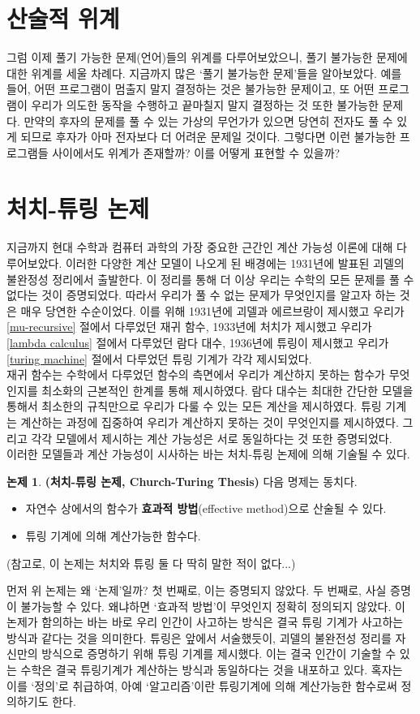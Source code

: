 \documentclass[b5paper]{book}
\theoremstyle{definition}
\newtheorem{thesis}{논제}[chapter]
\begin{document}
\section{산술적 위계}
그럼 이제 풀기 가능한 문제(언어)들의 위계를 다루어보았으니, 풀기 불가능한 문제에 대한 위계를 
세울 차례다.
지금까지 많은 `풀기 불가능한 문제'들을 알아보았다. 예를 들어, 어떤 프로그램이 멈출지 말지 결정하는 것은
불가능한 문제이고, 또 어떤 프로그램이 우리가 의도한 동작을 수행하고 끝마칠지 말지 결정하는 것 또한
불가능한 문제다. 만약의 후자의 문제를 풀 수 있는 가상의 무언가가 있으면 당연히 전자도 풀 수 있게 되므로
후자가 아마 전자보다 더 어려운 문제일 것이다. 그렇다면 이런 불가능한 프로그램들 사이에서도 
위계가 존재할까? 이를 어떻게 표현할 수 있을까?
\section{처치-튜링 논제}
지금까지 현대 수학과 컴퓨터 과학의 가장 중요한 근간인 계산 가능성 이론에
대해 다루어보았다. 이러한 다양한 계산 모델이 나오게 된 배경에는 1931년에
발표된 괴델의 불완정성 정리에서 출발한다. 이 정리를 통해 더 이상 우리는 수학의 모든 문제를 풀 수 
없다는 것이 증명되었다. 따라서 우리가 풀 수 없는 문제가 무엇인지를 알고자 하는 것은 매우 당연한
수순이었다. 이를 위해 1931년에 괴델과 에르브랑이 제시했고 우리가 \ref{mu-recursive} 절에서 다루었던 재귀 함수, 
1933년에 처치가 제시했고 우리가 \ref{lambda calculus} 절에서 다루었던 람다 대수, 1936년에 튜링이 제시했고
우리가 \ref{turing machine} 절에서 다루었던 튜링 기계가 각각 제시되었다. \\
재귀 함수는 수학에서 다루었던 함수의 측면에서 우리가 계산하지 못하는 함수가 무엇인지를 최소화의 근본적인
한계를 통해 제시하였다. 람다 대수는 최대한 간단한 모델을 통해서 최소한의 규칙만으로 우리가 다룰 수 있는 
모든 계산을 제시하였다. 튜링 기계는 계산하는 과정에 집중하여 우리가 계산하지 못하는 것이 무엇인지를
제시하였다. 그리고 각각 모델에서 제시하는 계산 가능성은 서로 동일하다는 것 또한 증명되었다. \\
이러한 모델들과 계산 가능성이 시사하는 바는 처치-튜링 논제에 의해 기술될 수 있다.
\begin{thesis} 
    \textbf{(처치-튜링 논제, Church-Turing Thesis)} 다음 명제는 동치다.
    \begin{itemize}
        \item 자연수 상에서의 함수가 \textbf{효과적 방법}(effective method)으로 산술될 수 있다.
        \item 튜링 기계에 의해 계산가능한 함수다.
    \end{itemize}
    (참고로, 이 논제는 처치와 튜링 둘 다 딱히 말한 적이 없다...)
\end{thesis}
먼저 위 논제는 왜 `논제'일까? 첫 번째로, 이는 증명되지 않았다. 두 번째로, 사실 증명이 불가능할 수 있다.
왜냐하면 `효과적 방법'이 무엇인지 정확히 정의되지 않았다. 이 논제가 함의하는 바는 바로 우리 인간이
사고하는 방식은 결국 튜링 기계가 사고하는 방식과 같다는 것을 의미한다. 튜링은 앞에서 서술했듯이,
괴델의 불완전성 정리를 자신만의 방식으로 증명하기 위해 튜링 기계를 제시했다. 이는 결국 인간이 기술할 수
있는 수학은 결국 튜링기계가 계산하는 방식과 동일하다는 것을 내포하고 있다.  
혹자는 이를 `정의'로 취급하여, 아예 `알고리즘'이란 튜링기계에 의해 계산가능한 함수로써 정의하기도 한다.
\end{document}
